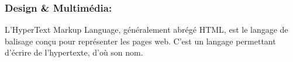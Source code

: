 \subsubsection{Design \& Multimédia:}
\begin{minipage}{0.2\textwidth}
	\begin{minipage}{\linewidth}
			\label{f3}%
	\end{minipage}
\end{minipage}
\hfill
\begin{minipage}{0.75\textwidth}
	L'HyperText Markup Language, généralement abrégé HTML, est le langage de balisage conçu pour représenter les pages web. C'est un langage permettant d'écrire de l'hypertexte, d'où son nom.\\
\end{minipage}\\

